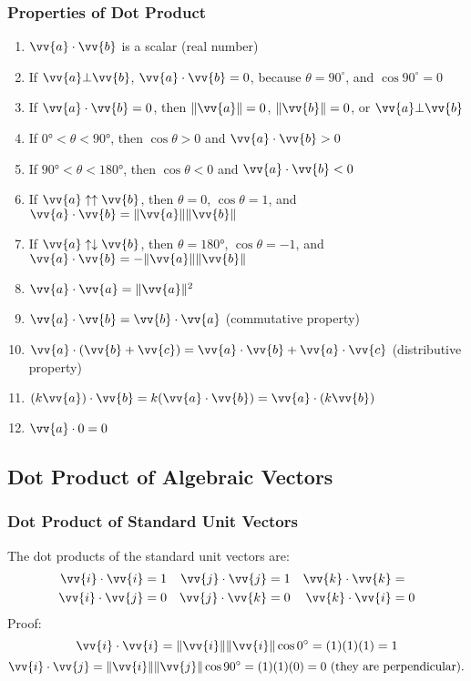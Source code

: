 \documentclass{article}
\newcommand{\mv}[1]{
	\lVert\vv{#1}\rVert
}
\begin{document}
	\subsubsection{Properties of Dot Product}
	\begin{enumerate}
		\item $\vv{a}\cdot\vv{b}$ is a scalar (real number)
		\item If $\vv{a}\bot\vv{b}$, $\vv{a}\cdot\vv{b}=0$, because $\theta=90^\circ$, and $\cos90^\circ=0$
		\item If $\vv{a}\cdot\vv{b}=0$, then $\mv{a}=0$, $\mv{b}=0$, or $\vv{a}\bot\vv{b}$
		\item If $\ang{0}<\theta<\ang{90}$, then $\cos\theta>0$ and $\vv{a}\cdot\vv{b}>0$
		\item If $\ang{90}<\theta<\ang{180}$, then $\cos\theta<0$ and $\vv{a}\cdot\vv{b}<0$
		\item If $\vv{a}\uparrow\uparrow\vv{b}$, then $\theta=0$, $\cos\theta=1$, and $\vv{a}\cdot\vv{b}=\mv{a}\mv{b}$
		\item If $\vv{a}\uparrow\downarrow\vv{b}$, then $\theta=\ang{180}$, $\cos\theta=-1$, and $\vv{a}\cdot\vv{b}=-\mv{a}\mv{b}$
		\item $\vv{a}\cdot\vv{a}=\mv{a}^2$
		\item $\vv{a}\cdot\vv{b}=\vv{b}\cdot\vv{a}$ (commutative property)
		\item $\vv{a}\cdot(\vv{b}+\vv{c})=\vv{a}\cdot\vv{b}+\vv{a}\cdot\vv{c}$ (distributive property)
		\item $(k\vv{a})\cdot\vv{b}=k(\vv{a}\cdot\vv{b})=\vv{a}\cdot(k\vv{b})$
		\item $\vv{a}\cdot0=0$
	\end{enumerate}
	\subsection{Dot Product of Algebraic Vectors}
	\subsubsection{Dot Product of Standard Unit Vectors}
	The dot products of the standard unit vectors are:
	\begin{align*}
		\vv{i}\cdot\vv{i}&=1&\vv{j}\cdot\vv{j}&=1&\vv{k}\cdot\vv{k}&=\\
		\vv{i}\cdot\vv{j}&=0&\vv{j}\cdot\vv{k}&=0&\vv{k}\cdot\vv{i}&=0
	\end{align*}
	Proof:
	\[\vv{i}\cdot\vv{i}=\mv{i}\mv{i}\cos\ang{0}=(1)(1)(1)=1\]\[\vv{i}\cdot\vv{j}=\mv{i}\mv{j}\cos\ang{90}=(1)(1)(0)=0 \text{ (they are perpendicular).}\]
\end{document}

